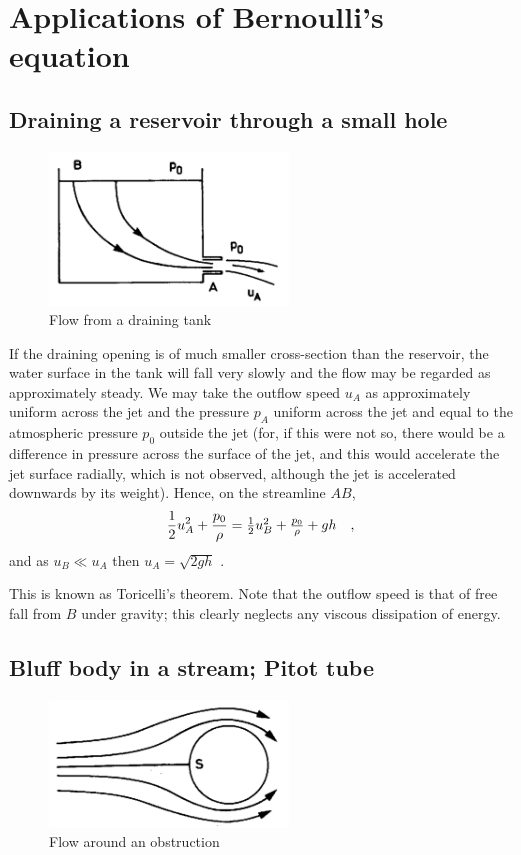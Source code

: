 \documentclass[10pt]{report}
\begin{document}
\section{Applications of Bernoulli's equation}
\subsection{Draining a reservoir through a small hole}

\begin{figure}
\centerline{\includegraphics[width=2.5in]{Section31.pdf}}
\label{fig2.1}
\caption{ Flow from a draining tank  }
\end{figure}

If the draining opening is of much smaller cross-section than the reservoir,
the water surface in the tank will fall very slowly and the flow may be
regarded as approximately steady. We may take the outflow speed $u_{A}$ as
approximately uniform across the jet and the pressure $p_{A}$ uniform across
the jet and equal to the atmospheric pressure $p_{0}$ outside the jet (for,
if this were not so, there would be a difference in pressure across the
surface of the jet, and this would accelerate the jet surface radially,
which is not observed, although the jet is accelerated downwards by its
weight). Hence, on the streamline $AB$,
\[
{1 \over 2}u_A^2 +\frac{p_0 }{\rho }=\textstyle{1
\over 2}u_B ^2+\frac{p_0 }{\rho }+gh\quad ,
\]
and as $u_{B} \ll u_{A }$ then $u_A =\sqrt {2gh} $ .

This is known as Toricelli's theorem. Note that the outflow speed is that of
free fall from $B$ under gravity; this clearly neglects any viscous
dissipation of energy.

\subsection{Bluff body in a stream; Pitot tube}
\begin{figure}
\centerline{\includegraphics[width=2.5in]{Section32.pdf}}
\caption{ Flow around an obstruction }
\label{fig2.2}
\end{figure}
\end{document}
